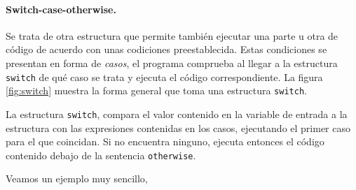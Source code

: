 

\paragraph{Switch-case-otherwise.} Se trata de otra estructura que permite también ejecutar una parte u otra de código de acuerdo con unas codiciones preestablecida. Estas condiciones se presentan en forma de \emph{casos}, el programa comprueba al llegar a la estructura \texttt{switch} de qué caso se trata y ejecuta el código correspondiente. La figura \ref{fig:switch} muestra la forma general que toma una estructura \texttt{switch}.

La estructura \texttt{switch}, compara el valor contenido en la variable de entrada a la estructura con las expresiones contenidas en los casos, ejecutando el primer caso para el que coincidan. Si no encuentra ninguno, ejecuta entonces el código contenido debajo de la sentencia \texttt{otherwise}.

Veamos un ejemplo muy sencillo,


  



